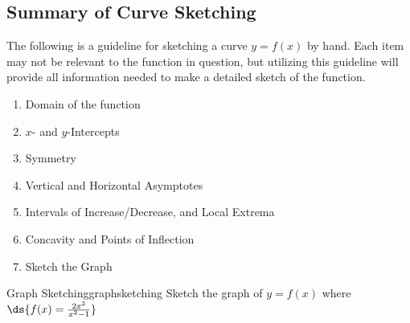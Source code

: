 \subsection{Summary of Curve Sketching}\label{subsec:SummaryCurveSketching}

The following is a guideline for sketching a curve $y=f(x)$ by hand. Each item may not be relevant to the function in question, but utilizing this guideline will provide all information needed to make a detailed sketch of the function.

\begin{formulabox}
\begin{enumerate}
	\item	Domain of the function
	\item	$x$- and $y$-Intercepts
	\item	Symmetry
	\item	Vertical and Horizontal Asymptotes
	\item	Intervals of Increase/Decrease, and Local Extrema
	\item	Concavity and Points of Inflection
	\item	Sketch the Graph
\end{enumerate}
\end{formulabox}

\begin{example}{Graph Sketching}{graphsketching}
Sketch the graph of $y=f(x)$ where $\ds{f(x)=\frac{2x^2}{x^2-1}}$
\end{example}

